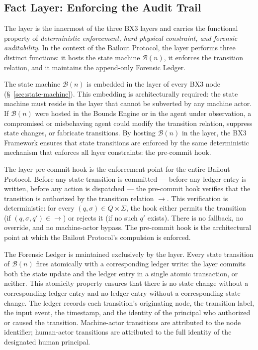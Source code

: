 \subsection{Fact Layer: Enforcing the Audit Trail}
\label{sec:fact-layer}

The \fact{} layer is the innermost of the three BX3 layers and carries the functional property of \emph{deterministic enforcement, hard physical constraint, and forensic auditability}. In the context of the Bailout Protocol, the \fact{} layer performs three distinct functions: it hosts the state machine $\mathcal{B}(n)$, it enforces the transition relation, and it maintains the append-only Forensic Ledger.

The state machine $\mathcal{B}(n)$ is embedded in the \fact{} layer of every BX3 node (\S~\ref{sec:state-machine}). This embedding is architecturally required: the state machine must reside in the layer that cannot be subverted by any machine actor. If $\mathcal{B}(n)$ were hosted in the Bounds Engine or in the agent under observation, a compromised or misbehaving agent could modify the transition relation, suppress state changes, or fabricate transitions. By hosting $\mathcal{B}(n)$ in the \fact{} layer, the BX3 Framework ensures that state transitions are enforced by the same deterministic mechanism that enforces all \fact{} layer constraints: the pre-commit hook.

The \fact{} layer pre-commit hook is the enforcement point for the entire Bailout Protocol. Before any state transition is committed --- before any ledger entry is written, before any action is dispatched --- the pre-commit hook verifies that the transition is authorized by the transition relation $\rightarrow$. This verification is deterministic: for every $(q, \sigma) \in Q \times \Sigma$, the hook either permits the transition (if $(q, \sigma, q') \in \rightarrow$) or rejects it (if no such $q'$ exists). There is no fallback, no override, and no machine-actor bypass. The pre-commit hook is the architectural point at which the Bailout Protocol's compulsion is enforced.

The Forensic Ledger is maintained exclusively by the \fact{} layer. Every state transition of $\mathcal{B}(n)$ fires atomically with a corresponding ledger write: the \fact{} layer commits both the state update and the ledger entry in a single atomic transaction, or neither. This atomicity property ensures that there is no state change without a corresponding ledger entry and no ledger entry without a corresponding state change. The ledger records each transition's originating node, the transition label, the input event, the timestamp, and the identity of the principal who authorized or caused the transition. Machine-actor transitions are attributed to the node identifier; human-actor transitions are attributed to the full identity of the designated human principal.


